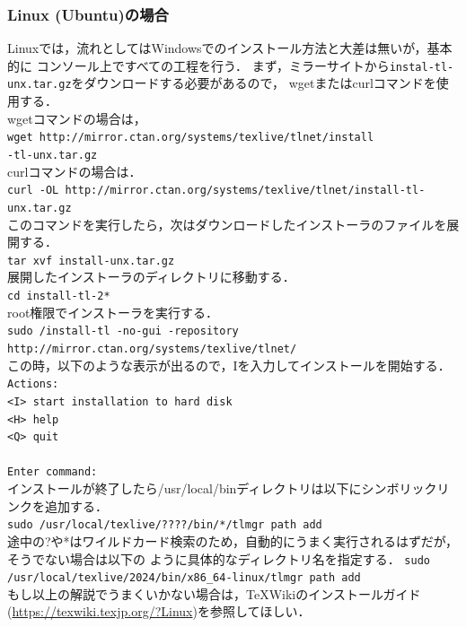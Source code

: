 \subsubsection{Linux (Ubuntu)の場合}
Linuxでは，流れとしてはWindowsでのインストール方法と大差は無いが，基本的に
コンソール上ですべての工程を行う．
まず，ミラーサイトから\texttt{instal-tl-unx.tar.gz}をダウンロードする必要があるので，
wgetまたはcurlコマンドを使用する．\\
wgetコマンドの場合は，\\
\texttt{wget http://mirror.ctan.org/systems/texlive/tlnet/install\\-tl-unx.tar.gz}\\
curlコマンドの場合は．\\
\texttt{curl -OL http://mirror.ctan.org/systems/texlive/tlnet/install-tl-unx.tar.gz}\\
このコマンドを実行したら，次はダウンロードしたインストーラのファイルを展開する．\\
\texttt{tar xvf install-unx.tar.gz}\\
展開したインストーラのディレクトリに移動する．\\
\texttt{cd install-tl-2*}\\
root権限でインストーラを実行する．\\
\texttt{sudo /install-tl -no-gui -repository \\
  http://mirror.ctan.org/systems/texlive/tlnet/}\\
この時，以下のような表示が出るので，Iを入力してインストールを開始する．
\texttt{
  Actions: \\
  <I> start  installation to hard disk\\
  <H> help\\
  <Q> quit\\
  \\
  Enter command:
}\\
インストールが終了したら/usr/local/binディレクトリは以下にシンボリックリンクを追加する．\\
\texttt{sudo /usr/local/texlive/????/bin/*/tlmgr path add}\\
途中の?や*はワイルドカード検索のため，自動的にうまく実行されるはずだが，そうでない場合は以下の
ように具体的なディレクトリ名を指定する．
\texttt{sudo /usr/local/texlive/2024/bin/x86\_64-linux/tlmgr path add}\\
もし以上の解説でうまくいかない場合は，TeXWikiのインストールガイド(\url{https://texwiki.texjp.org/?Linux})を参照してほしい．

